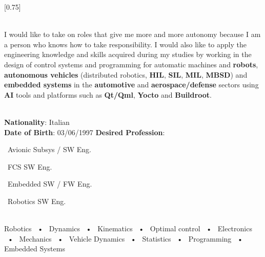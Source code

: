 \documentclass[lighthipster]{simplehipstercv}
\begin{document}
    \setlength{\columnsep}{1.5cm}
    [0.75]
    \begin{paracol}{2}
    
    \paracolbackgroundoptions
    
    
    
    
    \footnotesize
    {
        \setasidefontcolour
        \flushright
        \begin{center}
        \end{center}
        
        \\[0.5em]
            {\footnotesize 
            I would like to take on roles that give me more and more autonomy because I am a person who knows how to take
            responsibility. I would also like to apply the engineering
            knowledge and skills acquired during my studies by working in the
            design of control systems and programming for automatic
            machines and \textbf{robots}, \textbf{autonomous vehicles} (distributed robotics,
            \textbf{HIL}, \textbf{SIL}, \textbf{MIL}, \textbf{MBSD}) and \textbf{embedded systems} in the \textbf{automotive} and
            \textbf{aerospace/defense} sectors using \textbf{AI} tools and platforms such as \textbf{Qt/Qml},
            \textbf{Yocto} and \textbf{Buildroot}.
            }
        
        \bigskip
        
         \\[0.5em]
        \textbf{Nationality}: Italian \\
        \textbf{Date of Birth}: 03/06/1997
        \textbf{Desired Profession}: \par 
        \textbullet\ Avionic Subsys / SW Eng. \par
        \textbullet\ FCS SW Eng. \par 
        \textbullet\ Embedded SW / FW Eng. \par
        \textbullet\ Robotics SW Eng.
        
        \bigskip
        
         \\[0.5em]
        Robotics ~•~ Dynamics ~•~ Kinematics ~•~ Optimal control ~•~ Electronics ~•~ Mechanics ~•~ Vehicle Dynamics ~•~ Statistics
        ~•~ Programming ~•~ Embedded Systems 
        
}
\end{paracol}
\end{document}
